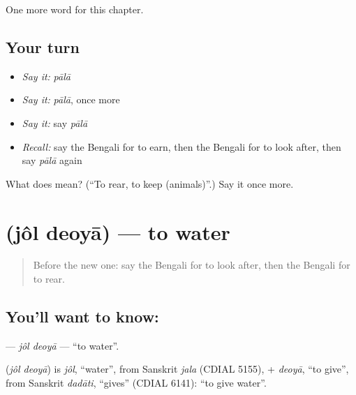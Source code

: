 \begin{grammarlens}[title={What you've built}]
One more word for this chapter.
\end{grammarlens}

\subsection*{Your turn}
\begin{itemize}
\raggedright
  \item \emph{Say it:} \emph{pālā}
  \item \emph{Say it:} \emph{pālā}, once more
  \item \emph{Say it:} say \emph{pālā}
  \item \emph{Recall:} say the Bengali for to earn, then the Bengali for to look after, then say \emph{pālā} again
\end{itemize}

\begin{tcolorbox}[breakable,colback=teal!4,colframe=teal!35!black,title={Before you move on}]
What does  mean? (\textquotedblleft{}To rear, to keep (animals)\textquotedblright{}.) Say it once more.
\end{tcolorbox}
\section[\texorpdfstring{\bn{জল} \bn{দেওয়া} (jôl deoyā)}{জল দেওয়া (jôl deoyā)}]{  (jôl deoyā) — to water}

\label{lesson:BN-C180-jol-deoya}



\begin{quote}
Before the new one: say the Bengali for to look after, then the Bengali for to rear.
\end{quote}

\subsection*{You'll want to know:  }
\textbf{ } — \emph{jôl deoyā} — \textquotedblleft{}to water\textquotedblright{}.

\begin{cousinweb}
\textbf{ } (\emph{jôl deoyā}) is \emph{jôl}, \textquotedblleft{}water\textquotedblright{}, from Sanskrit \emph{jala} (CDIAL 5155), + \emph{deoyā}, \textquotedblleft{}to give\textquotedblright{}, from Sanskrit \emph{dadāti}, \textquotedblleft{}gives\textquotedblright{} (CDIAL 6141): \textquotedblleft{}to give water\textquotedblright{}.
\end{cousinweb}

